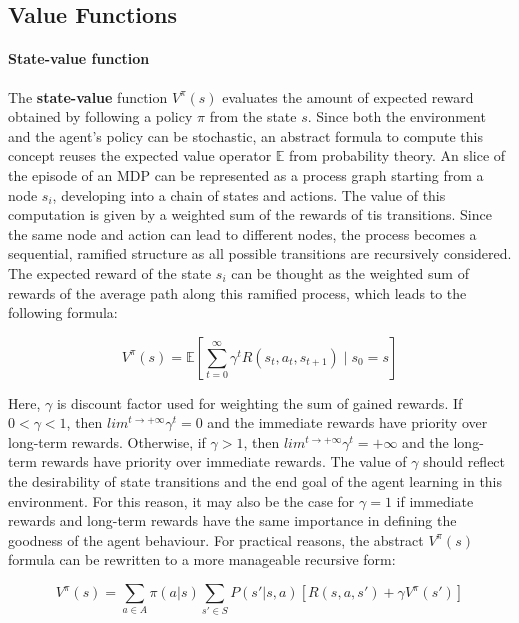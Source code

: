 \subsection{Value Functions}

\paragraph{State-value function}
\label{par:state-value-function}

The \textbf{state-value} function $V^{\pi}(s)$ evaluates the amount of expected reward obtained by following a policy $\pi$ from the state $s$.
Since both the environment and the agent's policy can be stochastic, an abstract formula to compute this concept reuses the expected value operator $\mathbb{E}$ from probability theory.
An slice of the episode of an MDP can be represented as a process graph starting from a node $s_i$, developing into a chain of states and actions. The value of this computation is given by a weighted sum of the rewards of tis transitions.
Since the same node and action can lead to different nodes, the process becomes a sequential, ramified structure as all possible transitions are recursively considered.
The expected reward of the state $s_i$ can be thought as the weighted sum of rewards of the average path along this ramified process, which leads to the following formula:

\begin{equation} \label{eq:v-pi-E}
V^\pi(s) = \mathbb{E} \left[ \sum_{t=0}^{\infty} \gamma^t R(s_t, a_t, s_{t + 1}) \mid s_0 = s \right]
\end{equation}

Here, \textbf{$\gamma$} is discount factor used for weighting the sum of gained rewards. If $0 < \gamma < 1$, then $lim ^ {t \rightarrow +\infty} \gamma ^ t = 0$ and the immediate rewards have priority over long-term rewards. Otherwise, if $\gamma > 1$, then $lim ^ {t \rightarrow +\infty} \gamma ^ t = +\infty$ and the long-term rewards have priority over immediate rewards. The value of $\gamma$ should reflect the desirability of state transitions and the end goal of the agent learning in this environment. For this reason, it may also be the case for $\gamma = 1$ if immediate rewards and long-term rewards have the same importance in defining the goodness of the agent behaviour. For practical reasons, the abstract $V^{\pi}(s)$ formula can be rewritten to a more manageable recursive form:

\begin{equation} \label{eq:v-pi-bellman}
V^{\pi}(s) = \sum _ {a \in A} \pi (a | s) \sum _ {s' \in S} P(s' | s, a) \left[ R(s, a, s') + \gamma V^{\pi}(s') \right]
\end{equation}

